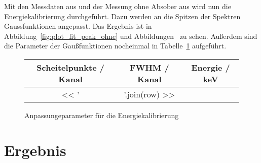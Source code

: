 \documentclass[11pt, ngerman, fleqn, DIV=15, headinclude, BCOR=2cm]{scrreprt}
\begin{document}
Mit den Messdaten aus \fehlt%
und der Messung ohne Absober aus \fehlt%
wird nun die Energiekalibrierung durchgeführt. Dazu werden an die Spitzen der
Spektren Gaussfunktionen angepasst. Das Ergebnis ist in
Abbildung~\ref{fig:plot_fit_peak_ohne} und Abbildungen~\fehlt%
zu sehen. Außerdem sind die Parameter der Gaußfunktionen nocheinmal in
Tabelle~\ref{tab:energiekalibrierung}
aufgeführt.

\begin{figure}
	\centering
	\begin{tabular}{SSS}
		{Scheitelpunkte / Kanal} &
		{FWHM / Kanal} &
		{Energie / \si{\kilo\electronvolt}}\\
		\midrule
		<< ' & '.join(row) >> \\
	\end{tabular}
	\caption{%
		Anpassungeparameter für die Energiekalibrierung
	}
	\label{tab:energiekalibrierung}
\end{figure}



\chapter{Ergebnis}



\end{document}
